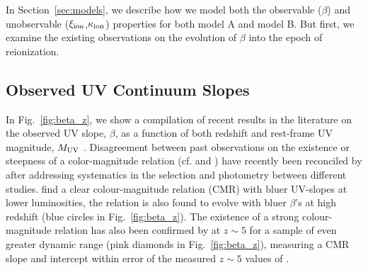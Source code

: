 In Section~\ref{sec:models}, we describe how we model both the observable ($\beta$) and unobservable ($\xi_{\rm{ion}}$,$\kappa_{\rm{ion}}$) properties for both model A and model B. But first, we examine the existing observations on the evolution of $\beta$ into the epoch of reionization.

\subsection{Observed UV Continuum Slopes}\label{sec:betas}
In Fig.~\ref{fig:beta_z}, we show a compilation of recent results in the literature on the observed UV slope, $\beta$, as a function of both redshift and rest-frame UV magnitude, $M_{\rm{UV}}$ \citep{Dunlop:2011jl,Dunlop:2013kp,Wilkins:2011fs,2012ApJ...756..164F,Bouwens:2013vf,Duncan:2014gh,Rogers:2014bn}. Disagreement between past observations on the existence or steepness of a color-magnitude relation (cf. \citet{Dunlop:2011jl} and \citet{Bouwens:2011tj}) have recently been reconciled by \citet{Bouwens:2013vf} after addressing systematics in the selection and photometry between different studies. \citet{Bouwens:2013vf} find a clear colour-magnitude relation (CMR) with bluer UV-slopes at lower luminosities, the relation is also found to evolve with bluer $\beta$'s at high redshift (blue circles in Fig.~\ref{fig:beta_z}). The existence of a strong colour-magnitude relation has also been confirmed by \citet{Rogers:2014bn} at $z\sim5$ for a sample of even greater dynamic range (pink diamonds in Fig.~\ref{fig:beta_z}), measuring a CMR slope and intercept within error of the measured $z\sim5$ values of \citet{Bouwens:2013vf}.

